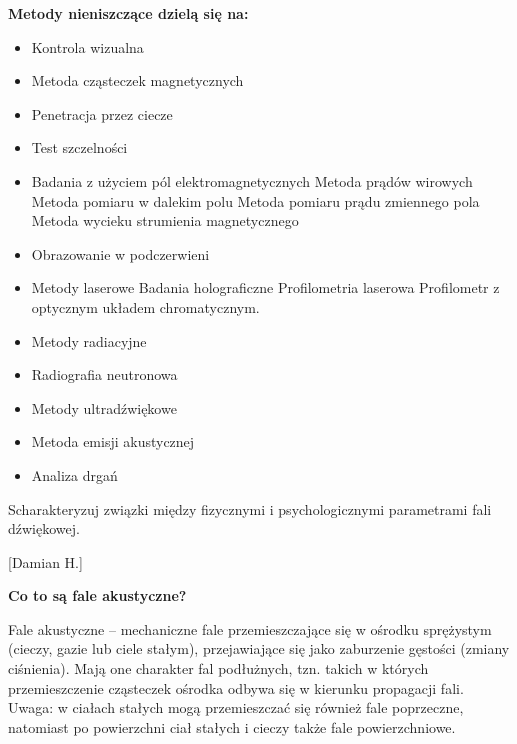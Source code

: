 \documentclass{article}
\begin{document}
\begin{enumerate}
{\bf Metody nieniszczące dzielą się na:}

\begin{itemize}
\item Kontrola wizualna 
\item Metoda cząsteczek magnetycznych 
\item Penetracja przez ciecze 
\item Test szczelności 
\item Badania z użyciem pól elektromagnetycznych 
Metoda prądów wirowych 
Metoda pomiaru w dalekim polu 
Metoda pomiaru prądu zmiennego pola 
Metoda wycieku strumienia magnetycznego 
\item Obrazowanie w podczerwieni 
\item Metody laserowe 
Badania holograficzne 
Profilometria laserowa 
Profilometr z optycznym układem chromatycznym. 
\item Metody radiacyjne 
\item Radiografia neutronowa 
\item Metody ultradźwiękowe 
\item Metoda emisji akustycznej 
\item Analiza drgań 
\end{itemize}






































{\Large \bf  \item Scharakteryzuj związki między fizycznymi i psychologicznymi parametrami fali
dźwiękowej.} [Damian H.]




{\bf Co to są fale akustyczne?}

Fale akustyczne – mechaniczne fale przemieszczające się w ośrodku sprężystym (cieczy, gazie lub ciele stałym), przejawiające się jako zaburzenie gęstości (zmiany ciśnienia). Mają one charakter fal podłużnych, tzn. takich w których przemieszczenie cząsteczek ośrodka odbywa się w kierunku propagacji fali. 
Uwaga: w ciałach stałych mogą przemieszczać się również fale poprzeczne, natomiast po powierzchni ciał stałych i cieczy także fale powierzchniowe.


\end{enumerate}
\end{document}
